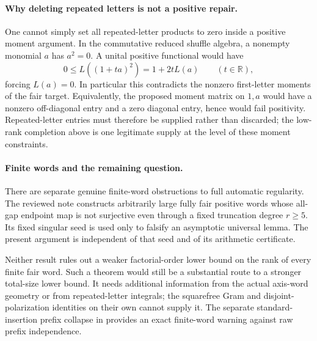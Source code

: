 \documentclass[11pt]{article}
\begin{document}
\paragraph{Why deleting repeated letters is not a positive repair.}
One cannot simply set all repeated-letter products to zero inside a
positive moment argument. In the commutative reduced shuffle algebra,
a nonempty monomial $a$ has $a^2=0$. A unital positive functional
would have
\[
 0\le L((1+ta)^2)=1+2tL(a)\qquad(t\in\mathbb R),
\]
forcing $L(a)=0$. In particular this contradicts the nonzero
first-letter moments of the fair target. Equivalently, the proposed
moment matrix on $1,a$ would have a nonzero off-diagonal entry and
a zero diagonal entry, hence would fail positivity. Repeated-letter
entries must therefore be supplied rather than discarded; the
low-rank completion above is one legitimate supply at the level
of these moment constraints.

\paragraph{Finite words and the remaining question.}
There are separate genuine finite-word obstructions to full automatic
regularity. The reviewed note
constructs arbitrarily large fully fair positive words whose all-gap
endpoint map is not surjective even through a fixed truncation degree
$r\ge5$. Its fixed singular seed is used only to falsify an asymptotic
universal lemma. The present argument is independent of that seed and
of its arithmetic certificate.

Neither result rules out a weaker factorial-order lower bound on the
rank of every finite fair word. Such a theorem would still be a
substantial route to a stronger total-size lower bound. It needs
additional information from the actual axis-word geometry or from
repeated-letter integrals; the squarefree Gram and disjoint-polarization
identities on their own cannot supply it. The separate standard-insertion
prefix collapse in
provides an exact finite-word warning against raw prefix independence.
\end{document}

